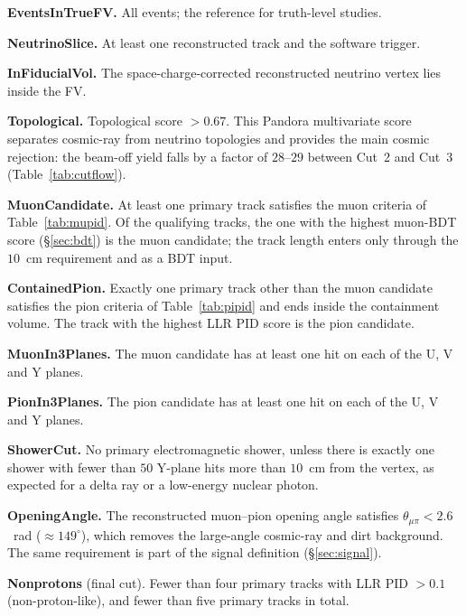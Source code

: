 \documentclass[11pt,a4paper]{article}
\begin{document}
\begin{description}[style=nextline, leftmargin=1.5cm, labelwidth=1.3cm]
  \item[\textbf{Cut 0.}] \textbf{EventsInTrueFV.}
    All events; the reference for truth-level studies.
  \item[\textbf{Cut 1.}] \textbf{NeutrinoSlice.}
    At least one reconstructed track and the software trigger. 
  \item[\textbf{Cut 2.}] \textbf{InFiducialVol.}
    The space-charge-corrected reconstructed neutrino vertex lies inside the FV.
  \item[\textbf{Cut 3.}] \textbf{Topological.}
    Topological score $> 0.67$. This Pandora multivariate score separates cosmic-ray from neutrino
    topologies and provides the main cosmic rejection: the beam-off yield falls by a factor of
    $28$--$29$ between Cut~2 and Cut~3 (Table~\ref{tab:cutflow}).
  \item[\textbf{Cut 4.}] \textbf{MuonCandidate.}
    At least one primary track satisfies the muon criteria of Table~\ref{tab:mupid}. Of the
    qualifying tracks, the one with the highest muon-BDT score (\S\ref{sec:bdt}) is the muon
    candidate; the track length enters only through the $10$~cm requirement and as a BDT input.
  \item[\textbf{Cut 5.}] \textbf{ContainedPion.}
    Exactly one primary track other than the muon candidate satisfies the pion criteria of
    Table~\ref{tab:pipid} and ends inside the containment volume. The track with the highest LLR
    PID score is the pion candidate.
  \item[\textbf{Cut 6.}] \textbf{MuonIn3Planes.}
    The muon candidate has at least one hit on each of the U, V and Y planes.
  \item[\textbf{Cut 7.}] \textbf{PionIn3Planes.}
    The pion candidate has at least one hit on each of the U, V and Y planes.
  \item[\textbf{Cut 8.}] \textbf{ShowerCut.}
    No primary electromagnetic shower, unless there is exactly one shower with fewer than $50$
    Y-plane hits more than $10$~cm from the vertex, as expected for a delta ray or a low-energy
    nuclear photon.
  \item[\textbf{Cut 9.}] \textbf{OpeningAngle.}
    The reconstructed muon--pion opening angle satisfies $\theta_{\mu\pi} < 2.6$~rad
    ($\approx149^\circ$), which removes the large-angle cosmic-ray and dirt background. The same
    requirement is part of the signal definition (\S\ref{sec:signal}).
  \item[\textbf{Cut 10.}] \textbf{Nonprotons} (final cut).
    Fewer than four primary tracks with LLR PID $> 0.1$ (non-proton-like), and fewer than five
    primary tracks in total.
\end{description}
\end{document}
